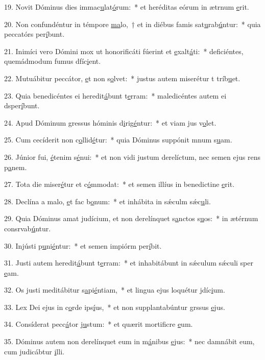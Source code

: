 19. Novit Dóminus dies immac\uline{u}lat\uline{ó}rum:~* et heréditas eórum in ætrnum \uline{e}rit.\par 
20. Non confundéntur in témpore \uline{ma}lo,~† et in diébus famis sat\uline{u}rab\uline{ú}ntur:~* quia peccatórs per\uline{í}bunt.\par 
21. Inimíci vero Dómini mox ut honorificáti fúerint et \uline{e}xalt\uline{á}ti:~* deficiéntes, quemádmodum fumus dfíc\uline{i}ent.\par 
22. Mutuábitur peccátor, \uline{e}t non s\uline{o}lvet:~* justus autem miserétur t tríb\uline{u}et.\par 
23. Quia benedicéntes ei heredit\uline{á}bunt t\uline{e}rram:~* maledicéntes autem ei dsper\uline{í}bunt.\par 
24. Apud Dóminum gressus hóminis d\uline{i}rig\uline{é}ntur:~* et viam jus v\uline{o}let.\par 
25. Cum cecíderit non c\uline{o}llid\uline{é}tur:~* quia Dóminus suppónit mnum s\uline{u}am.\par 
26. Júnior fui, \uline{é}tenim s\uline{é}nui:~* et non vidi justum derelíctum, nec semen ejus rens p\uline{a}nem.\par 
27. Tota die miser\uline{é}tur et c\uline{ó}mmodat:~* et semen illíus in benedictine \uline{e}rit.\par 
28. Declína a malo, \uline{e}t fac b\uline{o}num:~* et inhábita in sǽculm sǽc\uline{u}li.\par 
29. Quia Dóminus amat judícium, et non derelínquet s\uline{a}nctos s\uline{u}os:~* in ætérnum consrvab\uline{ú}ntur.\par 
30. Injústi p\uline{u}ni\uline{é}ntur:~* et semen impiórm per\uline{í}bit.\par 
31. Justi autem heredit\uline{á}bunt t\uline{e}rram:~* et inhabitábunt in sǽculum sǽculi sper \uline{e}am.\par 
32. Os justi meditábitur s\uline{a}pi\uline{é}ntiam,~* et lingua ejus loquétur jdíc\uline{i}um.\par 
33. Lex Dei ejus in c\uline{o}rde ips\uline{í}us,~* et non supplantabúntur grssus \uline{e}jus.\par 
34. Consíderat pecc\uline{á}tor j\uline{u}stum:~* et quærit mortificre \uline{e}um.\par 
35. Dóminus autem non derelínquet eum in m\uline{á}nibus \uline{e}jus:~* nec damnábit eum, cum judicábtur \uline{i}lli.\par 
